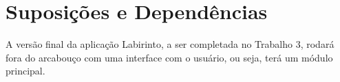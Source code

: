 \section{Suposições e Dependências}
A versão final da aplicação Labirinto, a ser completada no Trabalho 3, rodará fora do arcabouço
com uma interface com o usuário, ou seja, terá um módulo principal.
